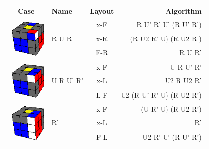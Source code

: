 \documentclass[a4paper]{article}
\begin{document}
\begin{table}[htb!]
\centering
\def\arraystretch{1.4}
\begin{tabular}{clcr}
Case \hspace{1cm} & Name & Layout & Algorithm
\\ \toprule
\multirow{3}{*}{\includegraphics[height=20mm]{RUpRp.png} \hspace{1cm}} & \multirow{3}[3]{*}{R U R' \hspace{1cm}} & x-F & R U' R' U' (R U' R')
\\ \cmidrule{3-4}
& & x-R & (R U2 R' U) (R U2 R')
\\ \cmidrule{3-4}
& & F-R & R U R'
\\ \midrule
\multirow{3}{*}{\includegraphics[height=20mm]{URUpRp.png} \hspace{1cm}} & \multirow{3}[3]{*}{U R U' R' \hspace{1cm}} & x-F & U R U' R'
\\ \cmidrule{3-4}
& & x-L & U2 R U2 R'
\\ \cmidrule{3-4}
& & L-F & U2 (R U' R' U) (R U2 R')
\\ \midrule
\multirow{3}{*}{\includegraphics[height=20mm]{Rp.png} \hspace{1cm}} & \multirow{3}[3]{*}{R' \hspace{1cm}} & x-F & (U R' U) (R U2 R')
\\ \cmidrule{3-4}
& & x-L & R'
\\ \cmidrule{3-4}
& & F-L & U2 R' U' (R U' R')
\\ \bottomrule
\end{tabular}
\end{table}
\end{document}
